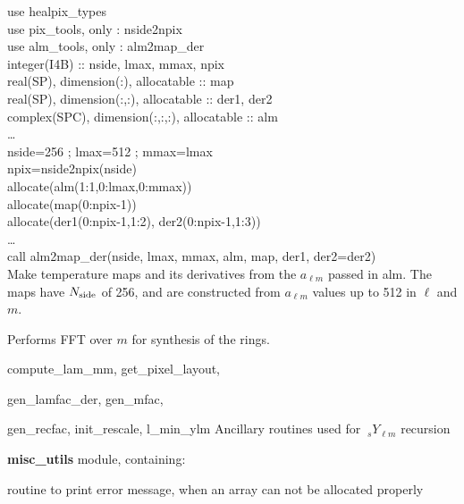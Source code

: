 \begin{example}
{
use healpix\_types \\
use pix\_tools, only : nside2npix \\
use alm\_tools, only : alm2map\_der \\
integer(I4B) :: nside, lmax, mmax, npix \\
real(SP), dimension(:), allocatable :: map \\
real(SP), dimension(:,:), allocatable :: der1, der2 \\
complex(SPC), dimension(:,:,:), allocatable :: alm \\
\ldots \\
nside=256 ; lmax=512 ; mmax=lmax\\
npix=nside2npix(nside)\\
allocate(alm(1:1,0:lmax,0:mmax))\\
allocate(map(0:npix-1))\\
allocate(der1(0:npix-1,1:2), der2(0:npix-1,1:3))\\
\ldots \\
call alm2map\_der(nside, lmax, mmax, alm, map, der1, der2=der2)  \\
}
{
Make temperature maps and its derivatives from the $a_{\ell m}$ passed in alm. The maps have $N_\mathrm{side}$ of 256, and are constructed from $a_{\ell m}$ values up to 512 in $\ell$ and $m$.
}
\end{example}

\begin{modules}
  \begin{sulist}{} %
  \item[\htmlref{ring\_synthesis}{sub:ring_synthesis}] Performs FFT over $m$ for synthesis of the rings.
  \item[compute\_lam\_mm, get\_pixel\_layout, ]
  \item[gen\_lamfac\_der, gen\_mfac,  ] 
  \item[gen\_recfac, init\_rescale, l\_min\_ylm] Ancillary routines used
  for $\ {_s}Y_{\ell m}$ recursion
  \item[\textbf{misc\_utils}] module, containing:
  \item[\htmlref{assert\_alloc}{sub:assert}] routine to print error message, when an array can not be
  allocated properly
  \end{sulist}
\end{modules}


